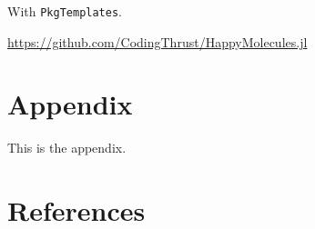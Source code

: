 \documentclass[
  notoc %
]{tufte-book}
\newcommand{\passthrough}[1]{#1}
\begin{document}
With \passthrough{\lstinline!PkgTemplates!}.

\url{https://github.com/CodingThrust/HappyMolecules.jl}

\hypertarget{appendix}{%
\chapter*{Appendix}\label{appendix}}

This is the appendix.

\hypertarget{references}{%
\chapter{References}\label{references}}

\backmatter
\end{document}
